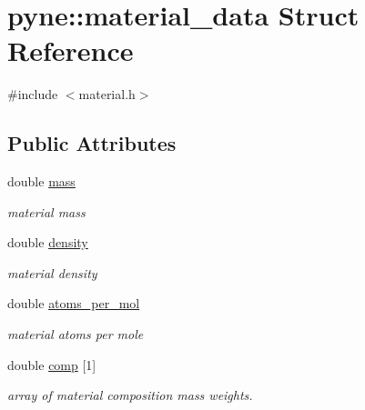 \hypertarget{structpyne_1_1material__data}{}\section{pyne\+:\+:material\+\_\+data Struct Reference}
\label{structpyne_1_1material__data}


{\ttfamily \#include $<$material.\+h$>$}

\subsection*{Public Attributes}
\begin{DoxyCompactItemize}
\item 
double \hyperlink{structpyne_1_1material__data_a8e5fa2bf074f5c7770fcefca825640b9}{mass}\hypertarget{structpyne_1_1material__data_a8e5fa2bf074f5c7770fcefca825640b9}{}\label{structpyne_1_1material__data_a8e5fa2bf074f5c7770fcefca825640b9}

\begin{DoxyCompactList}\small\item\em material mass \end{DoxyCompactList}\item 
double \hyperlink{structpyne_1_1material__data_adf19d9e0612f5ea9c6093ad09c63eee4}{density}\hypertarget{structpyne_1_1material__data_adf19d9e0612f5ea9c6093ad09c63eee4}{}\label{structpyne_1_1material__data_adf19d9e0612f5ea9c6093ad09c63eee4}

\begin{DoxyCompactList}\small\item\em material density \end{DoxyCompactList}\item 
double \hyperlink{structpyne_1_1material__data_a135b69d35e0bc6c49a025a24cb153798}{atoms\+\_\+per\+\_\+mol}\hypertarget{structpyne_1_1material__data_a135b69d35e0bc6c49a025a24cb153798}{}\label{structpyne_1_1material__data_a135b69d35e0bc6c49a025a24cb153798}

\begin{DoxyCompactList}\small\item\em material atoms per mole \end{DoxyCompactList}\item 
double \hyperlink{structpyne_1_1material__data_ac7c972f03200ebea0a958d28d73d7af9}{comp} \mbox{[}1\mbox{]}\hypertarget{structpyne_1_1material__data_ac7c972f03200ebea0a958d28d73d7af9}{}\label{structpyne_1_1material__data_ac7c972f03200ebea0a958d28d73d7af9}

\begin{DoxyCompactList}\small\item\em array of material composition mass weights. \end{DoxyCompactList}\end{DoxyCompactItemize}


